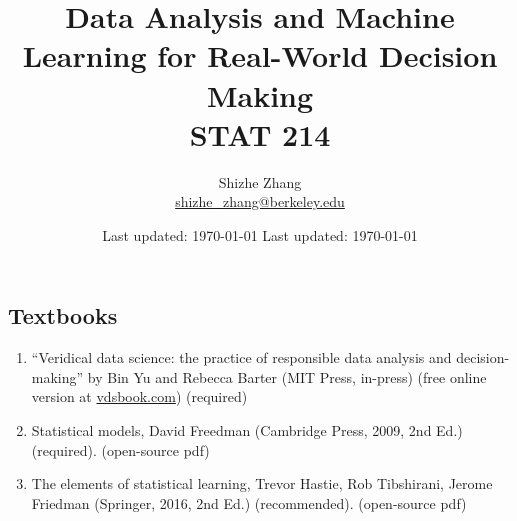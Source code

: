 \documentclass[letterpaper, 12pt]{article}
\newcommand{\1}{\mathds{1}}	%
\theoremstyle{definition}
\begin{document}

\title{Data Analysis and Machine Learning for Real-World Decision Making\\[1em]
\normalsize STAT 214}


\author{\normalsize Shizhe Zhang\\[0.3em]
\small\href{mailto:shizhe\_zhang@berkeley.edu}{shizhe\_zhang@berkeley.edu}}
\date{\normalsize\vspace{-1ex} Last updated: \today}

\date{\normalsize\vspace{-1ex} Last updated: \today}


\maketitle


\tableofcontents\label{sec:contents}










\subsection*{Textbooks} %
\label{sub:subsection name}

\begin{enumerate}
  \item “Veridical data science: the practice of responsible data analysis and decision-making”
by Bin Yu and Rebecca Barter (MIT Press, in-press) (free online version at
\href{https://vdsbook.com}{vdsbook.com}) (required)
  \item Statistical models, David Freedman (Cambridge Press, 2009, 2nd Ed.) (required).
(open-source pdf)
  \item The elements of statistical learning, Trevor Hastie, Rob Tibshirani, Jerome Friedman
(Springer, 2016, 2nd Ed.) (recommended). (open-source pdf)
\end{enumerate}



\end{document}
